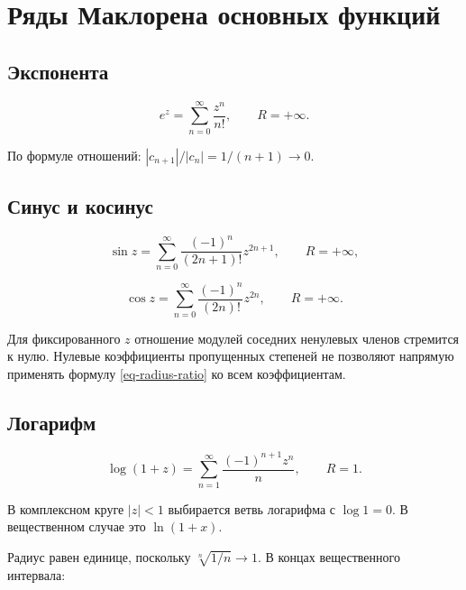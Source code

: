 \section{Ряды Маклорена основных функций}\label{sec-power-series-05}

\subsection{Экспонента}\label{sec-power-series-05-1}

\begin{equation}
e^z=\sum_{n=0}^\infty\frac{z^n}{n!},\qquad R=+\infty.
\label{eq-exp-series}
\end{equation}

По формуле отношений: \(|c_{n+1}|/|c_n|=1/(n+1)\to0\).

\subsection{Синус и косинус}\label{sec-power-series-05-2}

\begin{equation}
\sin z=\sum_{n=0}^\infty\frac{(-1)^n}{(2n+1)!}z^{2n+1},\qquad R=+\infty,
\label{eq-sin-series}
\end{equation}

\begin{equation}
\cos z=\sum_{n=0}^\infty\frac{(-1)^n}{(2n)!}z^{2n},\qquad R=+\infty.
\label{eq-cos-series}
\end{equation}

Для фиксированного \(z\) отношение модулей соседних ненулевых членов стремится к нулю. Нулевые коэффициенты пропущенных степеней не позволяют напрямую применять формулу \eqref{eq-radius-ratio} ко всем коэффициентам.

\subsection{Логарифм}\label{sec-power-series-05-3}

\begin{equation}
\log(1+z)=\sum_{n=1}^\infty\frac{(-1)^{n+1}z^n}{n},\qquad R=1.
\label{eq-log-series}
\end{equation}

В комплексном круге \(|z|<1\) выбирается ветвь логарифма с \(\log1=0\). В вещественном случае это \(\ln(1+x)\).

Радиус равен единице, поскольку \(\sqrt[n]{1/n}\to1\). В концах вещественного интервала:


